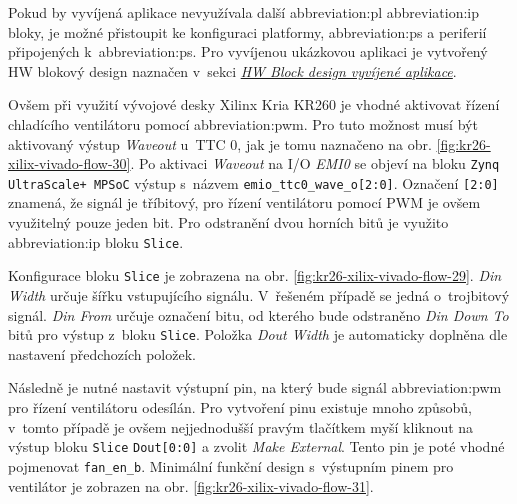 \documentclass[a4paper, twoside, 11pt]{article}
\begin{document}
				Pokud by vyvíjená aplikace nevyužívala další \gls{abbreviation:pl} \gls{abbreviation:ip} bloky, je možné přistoupit ke konfiguraci platformy, \gls{abbreviation:ps} a periferií připojených k~\gls{abbreviation:ps}. Pro vyvíjenou ukázkovou aplikaci je vytvořený HW blokový design naznačen v~sekci \hyperref[subsubsec:hw-block-design-vyvijene-aplikace]{\textit{HW Block design vyvíjené aplikace}}.\par
				Ovšem při využití vývojové desky Xilinx Kria KR260 je vhodné aktivovat řízení chladícího ventilátoru pomocí  \gls{abbreviation:pwm}. Pro tuto možnost musí být aktivovaný výstup \textit{Waveout} u~TTC 0, jak je tomu naznačeno na obr. \ref{fig:kr26-xilix-vivado-flow-30}. Po aktivaci \textit{Waveout} na I/O \textit{EMI0} se objeví na bloku \texttt{Zynq UltraScale+ MPSoC} výstup s~názvem \texttt{emio\_ttc0\_wave\_o[2:0]}. Označení \texttt{[2:0]} znamená, že signál je tříbitový, pro řízení ventilátoru pomocí PWM je ovšem využitelný pouze jeden bit. Pro odstranění dvou horních bitů je využito \gls{abbreviation:ip} bloku \texttt{Slice}.\par
				Konfigurace bloku \texttt{Slice} je zobrazena na obr. \ref{fig:kr26-xilix-vivado-flow-29}. \textit{Din Width} určuje šířku vstupujícího signálu. V~řešeném případě se jedná o~trojbitový signál. \textit{Din From} určuje označení bitu, od kterého bude odstraněno \textit{Din Down To} bitů pro výstup z~bloku \texttt{Slice}. Položka \textit{Dout Width} je automaticky doplněna dle nastavení předchozích položek.\par Následně je nutné nastavit výstupní pin, na který bude signál \gls{abbreviation:pwm} pro řízení ventilátoru odesílán. Pro vytvoření pinu existuje mnoho způsobů, v~tomto případě je ovšem nejjednodušší pravým tlačítkem myší kliknout na výstup bloku \texttt{Slice} \texttt{Dout[0:0]} a zvolit \textit{Make External}. Tento pin je poté vhodné pojmenovat \texttt{fan\_en\_b}. Minimální funkční design s~výstupním pinem pro ventilátor je zobrazen na obr. \ref{fig:kr26-xilix-vivado-flow-31}.
\end{document}
